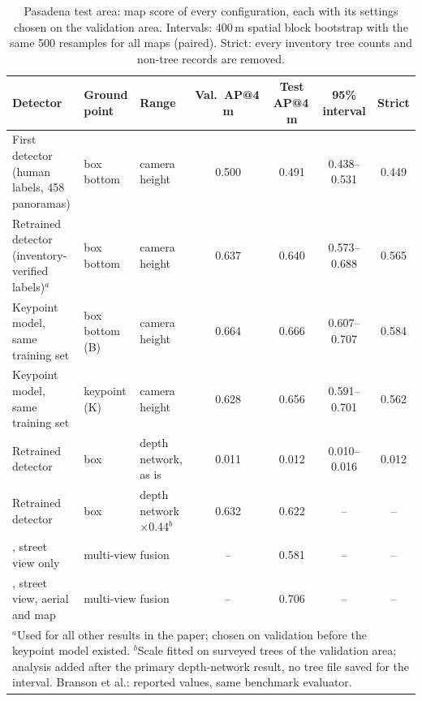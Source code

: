 \begin{table}[t]\centering\footnotesize
\caption{Pasadena test area: map score of every configuration, each with its settings chosen on the validation area. Intervals: 400\,m spatial block bootstrap with the same 500 resamples for all maps (paired). Strict: every inventory tree counts and non-tree records are removed.}\label{tab:pasadena}
\setlength{\tabcolsep}{3.5pt}
\begin{tabular}{p{4.0cm}p{1.7cm}p{2.4cm}cccc}\toprule
Detector & Ground point & Range & Val.\ AP@4\,m & Test AP@4\,m & 95\% interval & Strict\\\midrule
First detector (human labels, 458 panoramas) & box bottom & camera height & 0.500 & 0.491 & 0.438--0.531 & 0.449\\
Retrained detector (inventory-verified labels)$^{a}$ & box bottom & camera height & 0.637 & 0.640 & 0.573--0.688 & 0.565\\
Keypoint model, same training set & box bottom (B) & camera height & 0.664 & 0.666 & 0.607--0.707 & 0.584\\
Keypoint model, same training set & keypoint (K) & camera height & 0.628 & 0.656 & 0.591--0.701 & 0.562\\
Retrained detector & box & depth network, as is & 0.011 & 0.012 & 0.010--0.016 & 0.012\\
Retrained detector & box & depth network $\times$0.44$^{b}$ & 0.632 & 0.622 & -- & --\\
\midrule
\citet{branson2018google}, street view only & \multicolumn{2}{l}{multi-view fusion} & -- & 0.581 & -- & --\\
\citet{branson2018google}, street view, aerial and map & \multicolumn{2}{l}{multi-view fusion} & -- & 0.706 & -- & --\\
\bottomrule
\multicolumn{7}{p{14.0cm}}{\scriptsize $^{a}$Used for all other results in the paper; chosen on validation before the keypoint model existed. $^{b}$Scale fitted on surveyed trees of the validation area; analysis added after the primary depth-network result, no tree file saved for the interval. Branson et al.: reported values, same benchmark evaluator.}\\
\end{tabular}
\end{table}
